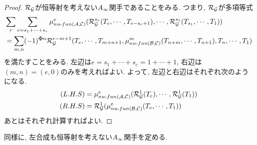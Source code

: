 \documentclass[uplatex, a4paper, 14Q, dvipdfmx]{jsarticle}
\begin{document}
\begin{proof}
  $\mathcal{R}_{\mathcal{G}}$が恒等射を考えない$A_{\infty}$関手であることをみる. 
  つまり, $\mathcal{R}_{\mathcal{G}}$が多項等式
  \begin{align*}
    &\sum_r \sum_{e=s_1+\cdots+s_r} \mu^e_{\nufun{\A}{\C}} (\RG^{s_r} (T_e,\cdots,T_{e-s_r+1}), \cdots, \RG^{s_1}(T_{s_1},\cdots,T_1)) \\ 
    &= \sum_{m,n} (-1)^{\maltese n} \RG^{e-m+1} (T_e,\cdots,T_{m+n+1}, \mu^m_{\nufun{\B}{\C}}(T_{n+m},\cdots,T_{n+1}), T_n,\cdots,T_1)
  \end{align*}
  を満たすことをみる. 
  左辺は$e = s_1+\cdots+s_e = 1+\cdots+1$, 右辺は$(m,n)=(e,0)$のみを考えればよい. 
  よって, 左辺と右辺はそれぞれ次のようになる. 
  \begin{align*}
    (L.H.S)
    &= \mu^e_{nu \text{-} fun (\mathcal{A}, \mathcal{C})}(\mathcal{R}_{\mathcal{G}}^1(T_e),\cdots,\mathcal{R}_{\mathcal{G}}^1(T_1)) \\
    (R.H.S)
    &= \mathcal{R}_{\mathcal{G}}^1(\mu^e_{nu \text{-} fun (\mathcal{B}, \mathcal{C})}(T_e,\cdots,T_1))
  \end{align*}
  あとはそれぞれ計算すればよい. 
\end{proof}

同様に, 左合成も恒等射を考えない$A_{\infty}$関手を定める. 
\end{document}
